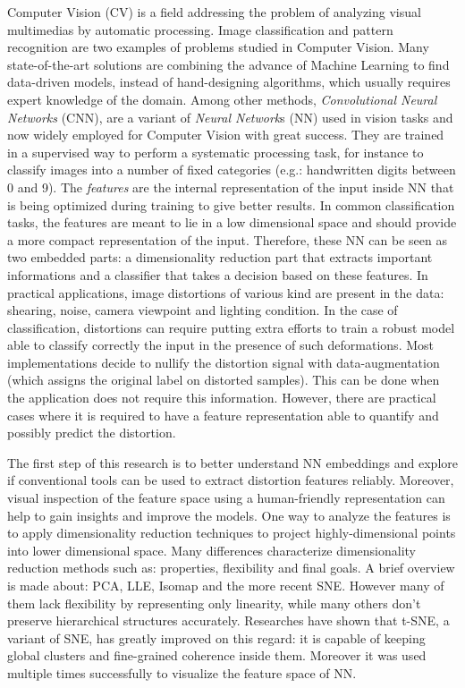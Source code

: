 \documentclass[a4paper,12pt]{report}
\newcommand{\eg}{e.g.}
\begin{document}
Computer Vision (CV) is a field addressing the problem of analyzing visual multimedias by automatic processing.
Image classification and pattern recognition are two examples of problems studied in Computer Vision.
Many state-of-the-art solutions are combining the advance of Machine Learning to find data-driven models, instead of hand-designing algorithms, which usually requires expert knowledge of the domain.
Among other methods, {\em Convolutional Neural Networks} (CNN), are a variant of {\em Neural Network}s (NN) used in vision tasks and now widely employed for Computer Vision with great success\cite{krizhevsky2012imagenet}\cite{rowley1998neural}\cite{prechelt1994proben1}.
They are trained in a supervised way to perform a systematic processing task, for instance to classify images into a number of fixed categories (\eg: handwritten digits between 0 and 9).
The {\em features} are the internal representation of the input inside NN that is being optimized during training to give better results.
In common classification tasks, the features are meant to lie in a low dimensional space and should provide a more compact representation of the input.
Therefore, these NN can be seen as two embedded parts: a dimensionality reduction part that extracts important informations and a classifier that takes a decision based on these features.
In practical applications, image distortions of various kind are present in the data: shearing, noise, camera viewpoint and lighting condition.
In the case of classification, distortions can require putting extra efforts to train a robust model able to classify correctly the input in the presence of such deformations.
Most implementations decide to nullify the distortion signal with data-augmentation (which assigns the original label on distorted samples).
This can be done when the application does not require this information.
However, there are practical cases where it is required to have a feature representation able to quantify and possibly predict the distortion.

The first step of this research is to better understand NN embeddings and explore if conventional tools can be used to extract distortion features reliably.
Moreover, visual inspection of the feature space using a human-friendly representation can help to gain insights and improve the models.
One way to analyze the features is to apply dimensionality reduction techniques to project highly-dimensional points into lower dimensional space.
Many differences characterize dimensionality reduction methods such as: properties, flexibility and final goals.
A brief overview is made about: PCA, LLE, Isomap and the more recent SNE.
However many of them lack flexibility by representing only linearity, while many others don't preserve hierarchical structures accurately\cite{t-SNE}.
Researches have shown that t-SNE, a variant of SNE, has greatly improved on this regard: it is capable of keeping global clusters and fine-grained coherence inside them.
Moreover it was used multiple times successfully to visualize the feature space of NN\cite{donahue2013decaf}\cite{yu2014visualizing}.
\end{document}
